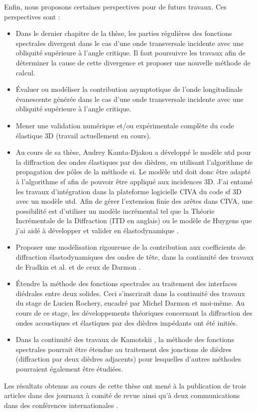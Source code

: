 Enfin, nous proposons certaines perspectives pour de futurs travaux. Ces perspectives sont :
\begin{itemize}
\item Dans le dernier chapitre de la thèse, les parties régulières des fonctions spectrales divergent dans le cas d'une onde transversale incidente avec une obliquité supérieure à l'angle critique. Il faut poursuivre les travaux afin de déterminer la cause de cette divergence et proposer une nouvelle méthode de calcul.
\item Évaluer ou modéliser la contribution asymptotique de l'onde longitudinale évanescente générée dans le cas d'une onde transversale incidente avec une obliquité supérieure à l'angle critique.
\item Mener une validation numérique et/ou expérimentale complète du code élastique 3D (travail actuellement en cours).
\item Au cours de sa thèse, Audrey Kamta-Djakou \cite{AKDthese} a développé le modèle \acrshort{utd} pour la diffraction des ondes élastiques par des dièdres, en utilisant l'algorithme de propagation des pôles de la méthode \acrshort{si}. Le modèle \acrshort{utd} doit donc être adapté à
l'algorithme \acrshort{sf} afin de pouvoir être appliqué aux incidences 3D. J'ai entamé les travaux d'intégration dans la plateforme logicielle CIVA du code \acrshort{sf} 3D avec un modèle \acrshort{utd}. Afin de gérer l'extension finie des arêtes dans CIVA, une possibilité est d'utiliser un modèle incrémental tel que la Théorie Incrémentale de la Diffraction (ITD en anglais) ou le modèle de Huygens que j'ai aidé à développer et valider en élastodynamique \cite{articleITD}.
\item Proposer une modélisation rigoureuse de la contribution aux coefficients de diffraction élastodynamiques des ondes de tête, dans la continuité des travaux de Fradkin et al. \cite{FradkinDarmon} et de ceux de Darmon \cite{HDRMichel}.
\item Étendre la méthode des fonctions spectrales au traitement des interfaces diédrales entre deux solides. Ceci s'inscrirait dans la continuité des travaux du stage de Lucien Rochery, encadré par Michel Darmon et moi-même. Au cours de ce stage, les développements théoriques concernant la diffraction des ondes acoustiques et élastiques par des dièdres impédants ont été initiés.
\item Dans la continuité des travaux de Kamotskii \cite{Kamotski2}, la méthode des fonctions spectrales pourrait être étendue au traitement des jonctions de dièdres (diffraction par deux dièdres adjacents) pour lesquelles d'autres méthodes \cite{Bernardpoly,BorovikovKinber} pourraient également être étudiées.
\end{itemize}


Les résultats obtenus au cours de cette thèse ont mené à la publication de trois articles dans des journaux à comité de revue \cite{articleITD,article,articleelasto} ainsi qu'à deux communications dans des conférences internationales \cite{DD2018,AFPAC}.